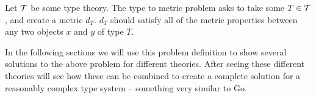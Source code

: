 \begin{definition}
    Let $\mathcal{T}$ be some type theory.
    The type to metric problem asks to take some $T \in \mathcal{T}$,
    and create a metric $d_{T}$.
    $d_{T}$ should satisfy all of the metric properties between any two objects $x$ and $y$ of type $T$.
\end{definition}

In the following sections we will use this problem definition to show several solutions to the above problem for different theories.
After seeing these different theories will see how these can be combined to create a complete solution for a reasonably complex type system --
something very similar to Go. 